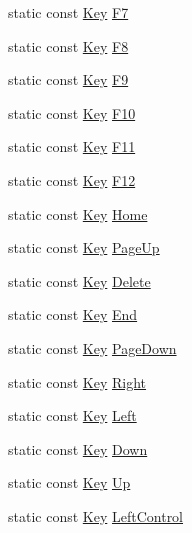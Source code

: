 \begin{DoxyCompactItemize}
static const \hyperlink{classastu_1_1Key}{Key} \hyperlink{classastu_1_1Keys_afc4bf359264b5b3d283134de66df0f91}{F7}
\item 
static const \hyperlink{classastu_1_1Key}{Key} \hyperlink{classastu_1_1Keys_ad32ba818b7d1d400e79f2f05abe8681e}{F8}
\item 
static const \hyperlink{classastu_1_1Key}{Key} \hyperlink{classastu_1_1Keys_ac3e824ce75a23b084d0afd3d861af618}{F9}
\item 
static const \hyperlink{classastu_1_1Key}{Key} \hyperlink{classastu_1_1Keys_ab4a256890a0f7e3daa4b20778f957b9c}{F10}
\item 
static const \hyperlink{classastu_1_1Key}{Key} \hyperlink{classastu_1_1Keys_ae8e5dfeda5d331962c11410cf568ba37}{F11}
\item 
static const \hyperlink{classastu_1_1Key}{Key} \hyperlink{classastu_1_1Keys_ae9c0f2af8dff6d4b8ec20e76322ed3c9}{F12}
\item 
static const \hyperlink{classastu_1_1Key}{Key} \hyperlink{classastu_1_1Keys_a09b3154fdde00d8b54e4f21a0d97d601}{Home}
\item 
static const \hyperlink{classastu_1_1Key}{Key} \hyperlink{classastu_1_1Keys_a4403f19ded9a8859a4dafe741d9cf181}{Page\+Up}
\item 
static const \hyperlink{classastu_1_1Key}{Key} \hyperlink{classastu_1_1Keys_a37c80317f504846cdc714f114ffe7117}{Delete}
\item 
static const \hyperlink{classastu_1_1Key}{Key} \hyperlink{classastu_1_1Keys_a53be79fb2d3250ef8a756b85b127849e}{End}
\item 
static const \hyperlink{classastu_1_1Key}{Key} \hyperlink{classastu_1_1Keys_aa71a74338d895274d924c26644f43da4}{Page\+Down}
\item 
static const \hyperlink{classastu_1_1Key}{Key} \hyperlink{classastu_1_1Keys_ae1dc0bb527b81b89cd8d7b0e12eb9e26}{Right}
\item 
static const \hyperlink{classastu_1_1Key}{Key} \hyperlink{classastu_1_1Keys_a32e3f6f6583dda50c07ad665efa77cb7}{Left}
\item 
static const \hyperlink{classastu_1_1Key}{Key} \hyperlink{classastu_1_1Keys_a2e4074f969ca45b2e03eb22d14fab302}{Down}
\item 
static const \hyperlink{classastu_1_1Key}{Key} \hyperlink{classastu_1_1Keys_a0cc563feb7356d1eb463687b8b66538a}{Up}
\item 
static const \hyperlink{classastu_1_1Key}{Key} \hyperlink{classastu_1_1Keys_a172c394582892b35ebaf5dbea2698a37}{Left\+Control}
\item 

\end{DoxyCompactItemize}
